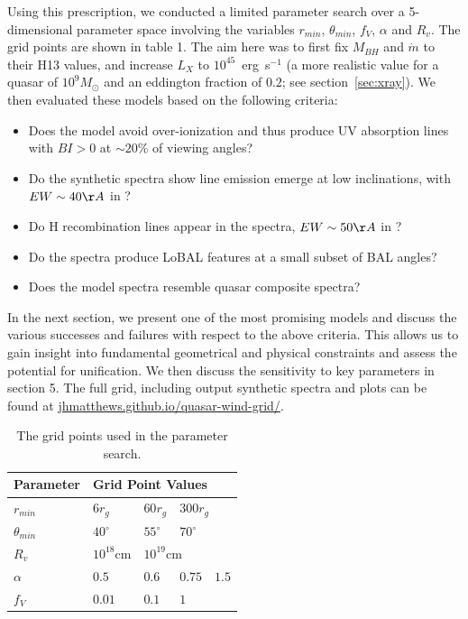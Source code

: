\documentclass[useAMS,usenatbib]{mn2e_x}
\begin{document}
Using this prescription, we conducted a limited parameter
search over a 5-dimensional parameter space involving the 
variables $r_{min}$, $\theta_{min}$, $f_V$, $\alpha$ and $R_v$.
The grid points are shown in table 1.
The aim here was to first fix $M_{BH}$ and $\dot{m}$ to their H13 values,
and increase $L_X$ to $10^{45}$~erg~s$^{-1}$ (a more realistic value for a 
quasar of $10^9M_\odot$ and an eddington fraction of $0.2$; see section~\ref{sec:xray}). 
We then evaluated these models based on the following criteria:
\begin{itemize}
\item Does the model avoid over-ionization and thus produce UV absorption lines 
with $BI > 0$ at $\sim20\%$ of viewing angles?
\item Do the synthetic spectra show  line emission emerge at low inclinations, with $EW\sim40\AA$ in \civ?
\item Do H recombination lines appear in the spectra, $EW\sim50\AA$ in \la?
\item Do the spectra  produce LoBAL features at a  small subset of BAL angles?
\item Does the model spectra resemble quasar composite spectra?
\end{itemize}
In the next section, we present one of the most promising models and discuss
the various successes and failures with respect to the above criteria.
This allows us to gain insight into fundamental geometrical 
and physical constraints and assess the potential for unification. 
We then discuss the sensitivity to key parameters in section 5.
The full grid, including output synthetic spectra and plots can be found at
\url{jhmatthews.github.io/quasar-wind-grid/}.


\begin{table}
\begin{tabular}{p{2cm}p{1cm}p{1cm}p{1cm}p{1cm}}
Parameter & \multicolumn{4}{|l|}{Grid Point Values}  \\
\hline \hline 
$r_{min}$ 	&	 $6r_{g}$ & $60r_{g}$ & \multicolumn{2}{|l|}{$300r_{g}$} \\ 
$\theta_{min}$ 	&	 $40^{\circ}$ & $55^{\circ}$ & \multicolumn{2}{|l|}{$70^{\circ}$} \\ 
$R_v$  	        &	 $10^{18}$cm & \multicolumn{3}{|l|}{$10^{19}$cm} \\ 
$\alpha$ 	&	 $0.5$ & $0.6$ & $0.75$ & $1.5$ \\
$f_V$ 	&	 $0.01$ & $0.1$ & \multicolumn{2}{|l|}{$1$}  \\
\hline 
\end{tabular}
\caption{The grid points used in the parameter search.}
\label{grid_table}
\end{table}
\end{document}
